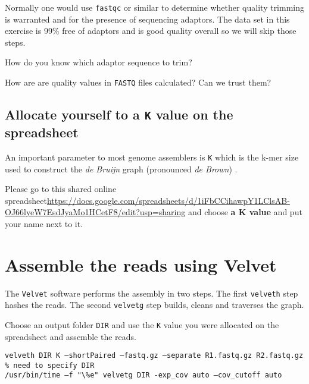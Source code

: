 Normally one would use \texttt{fastqc} or similar to determine whether quality trimming is warranted and for the presence of sequencing adaptors. 
The data set in this exercise is 99\% free of adaptors and is good quality overall so we will skip those steps.
\begin{questions}
How do you know which adaptor sequence to trim?
\begin{answer}
\end{answer}
How are are quality values in \texttt{FASTQ} files calculated? Can we trust them?
\begin{answer}
\end{answer}
\end{questions}

\subsection{Allocate yourself to a \texttt{K} value on the spreadsheet}

An important parameter to most genome assemblers is \texttt{K} which is the k-mer size used to construct the \textit{de Bruijn} graph (pronounced \textit{de Brown}) .

Please go to this shared online spreadsheet\url{https://docs.google.com/spreadsheets/d/1iFbCCihawpY1LClsAB-OJ66lyeW7EsdJyaMo1HCetF8/edit?usp=sharing} and choose \textbf{a K value} and put your name next to it.


\section{Assemble the reads using Velvet}
The \texttt{Velvet} software performs the assembly in two steps. The first \texttt{velveth} step hashes the reads. The second \texttt{velvetg} step builds, cleans and traverses the graph.

\begin{steps}
Choose an output folder \texttt{DIR} and use the \texttt{K} value you were allocated on the spreadsheet and assemble the reads.
\begin{lstlisting}
velveth DIR K –shortPaired –fastq.gz –separate R1.fastq.gz R2.fastq.gz % need to specify DIR
/usr/bin/time –f "\%e" velvetg DIR -exp_cov auto –cov_cutoff auto
\end{lstlisting}
\end{steps}

